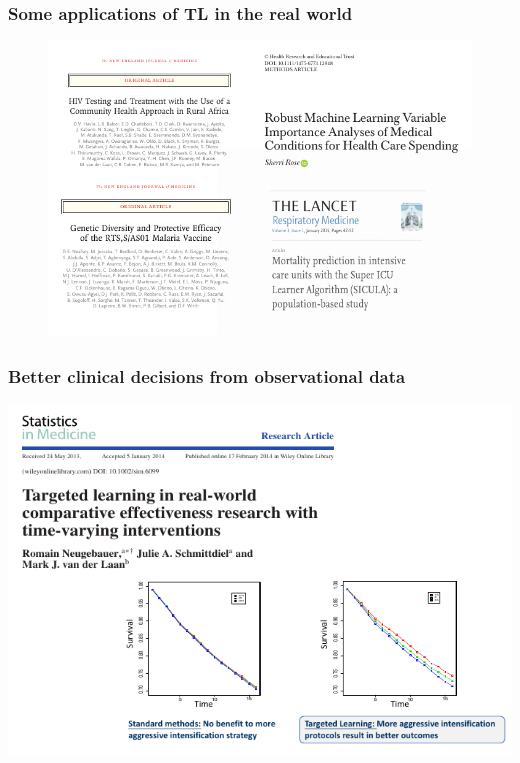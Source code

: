 \documentclass[t]{beamer}
\begin{document}
\begin{frame}
\frametitle{Some applications of TL in the real world}
\vspace{-20pt}
\centering
\begin{figure}
\includegraphics[width = 1.05\textwidth]{figures/applications.pdf}
\end{figure}
\end{frame}

\begin{frame}
\frametitle{Better clinical decisions from observational data}
\vspace{-20pt}
\begin{center}
  \includegraphics[width = 1.02\textwidth]{figures/diabetes.pdf}
  \end{center}
\end{frame}
\end{document}
